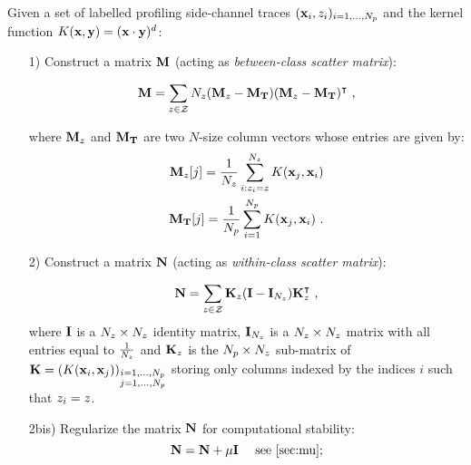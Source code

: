 \begin{procedure}\label{procedure:KDA}
Given a set of labelled profiling side-channel traces $(\vLeakVec_i, \sensVar_i)_{i=1, \dots , \nbProfilingTraces}$ and the kernel function $K(\vLeakVec,\yyy)= (\vLeakVec \cdot \yyy)^d$:
\begin{itemize}

\item[1)] Construct a matrix $\MMM$ (acting as \emph{between-class scatter matrix}):

\begin{equation}
\MMM = \sum_{\sensVar\in\sensVarSet}\nbTracesPerClass(\MMMclass - \MMMT)(\MMMclass-\MMMT)^\intercal\mbox{ ,}
\end{equation}

where $\MMMclass$ and $\MMMT$ are two $N$-size column vectors whose entries are given by:
\begin{align}
\MMMclass[\sensVar][j] = \frac{1}{\nbTracesPerClass}\sum_{i:\sensVar_i=\sensVar}^{\nbTracesPerClass}K(\vLeakVec_j,\vLeakVec_i)\\
\MMMT[j] = \frac{1}{\nbProfilingTraces}\sum_{i=1}^{\nbProfilingTraces}K(\vLeakVec_{j},\vLeakVec_{i}) \mbox{ .}
\end{align}


\item[2)] Construct a matrix $\NNN$ (acting as \emph{within-class scatter matrix}):

\begin{equation}\label{eq:N}
\NNN = \sum_{\sensVar\in\sensVarSet}\kernelMatrix_\sensVar(\III - \III_{\nbTracesPerClass})\kernelMatrix_\sensVar^\intercal\mbox{ ,}
\end{equation}
where $\III$ is a $\nbTracesPerClass \times \nbTracesPerClass$ identity matrix, $\III_{\nbTracesPerClass}$ is a $\nbTracesPerClass \times \nbTracesPerClass$ matrix with all entries equal to $\frac{1}{\nbTracesPerClass}$ and $\kernelMatrix_{\sensVar}$ is the $\nbProfilingTraces \times \nbTracesPerClass$ sub-matrix of $\kernelMatrix = (K(\vLeakVec_i,\vLeakVec_j))_{\substack{i=1,\dots,\nbProfilingTraces \\ j=1,\dots,\nbProfilingTraces}}$ storing only columns indexed by the indices $i$ such that $\sensVar_i=\sensVar$. 

\item[2bis)] Regularize the  matrix $\NNN$ for computational stability:
\begin{equation}\label{eq:mu}
\NNN = \NNN + \mu  \III \quad \mbox{ see \ref{sec:mu};}
\end{equation}


\end{itemize}
\end{procedure}
